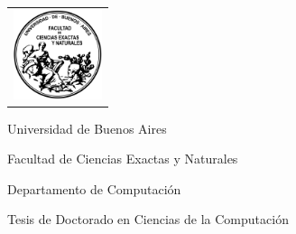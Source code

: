 \newcommand{\HRule}{\rule{\linewidth}{0.2mm}}
%
\thispagestyle{empty}

\begin{center}\leavevmode

\vspace{-2cm}

\begin{tabular}{l}
\includegraphics[width=2.6cm]{img/logofcen.png}
\end{tabular}


{\large \sc Universidad de Buenos Aires

Facultad de Ciencias Exactas y Naturales

Departamento de Computaci\'on}

\vspace{6.0cm}


\begin{huge}
\textbf{\tituloTesis}
\end{huge}

\vspace{2cm}

{\large Tesis de Doctorado en Ciencias de la Computaci\'on}

\vspace{2cm}

{\Large \autor}

\end{center}

\vfill

